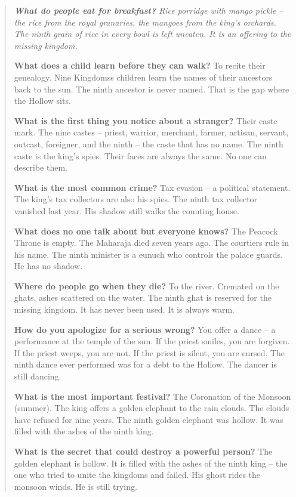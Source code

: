 \documentclass[12pt,oneside]{book}
\newenvironment{almanac}
  {\begin{quote}\small\itshape}
  {\end{quote}}
\begin{document}
\vspace{1em}
\begin{almanac}
\textbf{What do people eat for breakfast?} Rice porridge with mango pickle -- the rice from the royal granaries, the mangoes from the king's orchards. The ninth grain of rice in every bowl is left uneaten. It is an offering to the missing kingdom.

\textbf{What does a child learn before they can walk?} To recite their genealogy. Nine Kingdomss children learn the names of their ancestors back to the sun. The ninth ancestor is never named. That is the gap where the Hollow sits.

\textbf{What is the first thing you notice about a stranger?} Their caste mark. The nine castes -- priest, warrior, merchant, farmer, artisan, servant, outcast, foreigner, and the ninth -- the caste that has no name. The ninth caste is the king's spies. Their faces are always the same. No one can describe them.

\textbf{What is the most common crime?} Tax evasion -- a political statement. The king's tax collectors are also his spies. The ninth tax collector vanished last year. His shadow still walks the counting house.

\textbf{What does no one talk about but everyone knows?} The Peacock Throne is empty. The Maharaja died seven years ago. The courtiers rule in his name. The ninth minister is a eunuch who controls the palace guards. He has no shadow.

\textbf{Where do people go when they die?} To the river. Cremated on the ghats, ashes scattered on the water. The ninth ghat is reserved for the missing kingdom. It has never been used. It is always warm.

\textbf{How do you apologize for a serious wrong?} You offer a dance -- a performance at the temple of the sun. If the priest smiles, you are forgiven. If the priest weeps, you are not. If the priest is silent, you are cursed. The ninth dance ever performed was for a debt to the Hollow. The dancer is still dancing.

\textbf{What is the most important festival?} The Coronation of the Monsoon (summer). The king offers a golden elephant to the rain clouds. The clouds have refused for nine years. The ninth golden elephant was hollow. It was filled with the ashes of the ninth king.

\textbf{What is the secret that could destroy a powerful person?} The golden elephant is hollow. It is filled with the ashes of the ninth king -- the one who tried to unite the kingdoms and failed. His ghost rides the monsoon winds. He is still trying.
\end{almanac}
\end{document}

